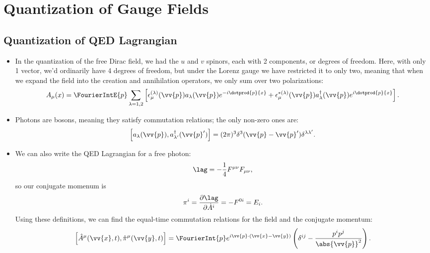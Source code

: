 \section{Quantization of Gauge Fields}

\subsection*{Quantization of QED Lagrangian}

\begin{itemize}
    \item In the quantization of the free Dirac field, we had the $u$ and $v$ spinors, each with 2 components, or degrees of freedom. Here, with only 1 vector, we'd ordinarily have 4 degrees of freedom, but under the Lorenz gauge we have restricted it to only two, meaning that when we expand the field into the creation and annihilation operators, we only sum over two polarizations:
        \begin{equation}
            A_{\mu}(x) = \FourierIntE{p} \sum_{\lambda=1,2} \left[ \epsilon_{\mu}^{(\lambda)}(\vv{p})a_{\lambda}(\vv{p}) e^{-i\dotprod{p}{x}} + \epsilon_{\mu}^{*(\lambda)}(\vv{p}) a_{\lambda}^{\dagger}(\vv{p})e^{i\dotprod{p}{x}} \right].
        \end{equation}
    \item Photons are bosons, meaning they satisfy commutation relations; the only non-zero ones are:
        \begin{equation}
            \left[ a_{\lambda}(\vv{p}),a_{\lambda'}^{\dagger}(\vv{p}') \right] = (2\pi)^3\delta^3(\vv{p}-\vv{p}')\delta^{\lambda\lambda'}.
        \end{equation}
    \item We can also write the QED Lagrangian for a free photon:
        \begin{equation*}
            \lag = -\frac{1}{4}F^{\mu\nu}F_{\mu\nu},
        \end{equation*}
        so our conjugate momenum is
        \begin{equation}
            \pi^i = \frac{\partial\lag}{\partial\dot{A}^i} = -F^{0i} = E_i.
        \end{equation}
        Using these definitions, we can find the equal-time commutation relations for the field and the conjugate momentum:
        \begin{equation}
            \left[ \hat{A}^{\mu}(\vv{x},t), \hat{\pi}^{\mu}(\vv{y},t) \right] = \FourierInt{p} e^{i\vv{p}\cdot(\vv{x}-\vv{y})} \left( \delta^{ij} - \frac{p^ip^j}{\abs{\vv{p}}^2} \right).

\end{equation}
\end{itemize}
